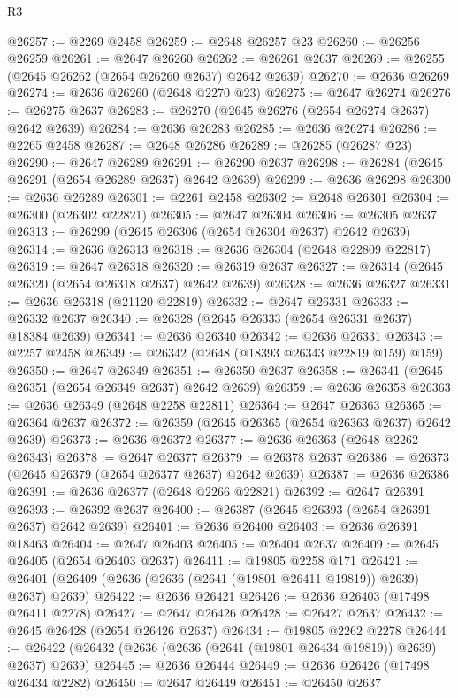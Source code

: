 \begin{lexlean}{R3}
\begin{coremodule}
@26257 := @2269 @2458
@26259 := @2648 @26257 @23
@26260 := @26256 @26259
@26261 := @2647 @26260
@26262 := @26261 @2637
@26269 := @26255 (@2645 @26262 (@2654 @26260 @2637) @2642 @2639)
@26270 := @2636 @26269
@26274 := @2636 @26260 (@2648 @2270 @23)
@26275 := @2647 @26274
@26276 := @26275 @2637
@26283 := @26270 (@2645 @26276 (@2654 @26274 @2637) @2642 @2639)
@26284 := @2636 @26283
@26285 := @2636 @26274
@26286 := @2265 @2458
@26287 := @2648 @26286
@26289 := @26285 (@26287 @23)
@26290 := @2647 @26289
@26291 := @26290 @2637
@26298 := @26284 (@2645 @26291 (@2654 @26289 @2637) @2642 @2639)
@26299 := @2636 @26298
@26300 := @2636 @26289
@26301 := @2261 @2458
@26302 := @2648 @26301
@26304 := @26300 (@26302 @22821)
@26305 := @2647 @26304
@26306 := @26305 @2637
@26313 := @26299 (@2645 @26306 (@2654 @26304 @2637) @2642 @2639)
@26314 := @2636 @26313
@26318 := @2636 @26304 (@2648 @22809 @22817)
@26319 := @2647 @26318
@26320 := @26319 @2637
@26327 := @26314 (@2645 @26320 (@2654 @26318 @2637) @2642 @2639)
@26328 := @2636 @26327
@26331 := @2636 @26318 (@21120 @22819)
@26332 := @2647 @26331
@26333 := @26332 @2637
@26340 := @26328 (@2645 @26333 (@2654 @26331 @2637) @18384 @2639)
@26341 := @2636 @26340
@26342 := @2636 @26331
@26343 := @2257 @2458
@26349 := @26342 (@2648 (@18393 @26343 @22819 @159) @159)
@26350 := @2647 @26349
@26351 := @26350 @2637
@26358 := @26341 (@2645 @26351 (@2654 @26349 @2637) @2642 @2639)
@26359 := @2636 @26358
@26363 := @2636 @26349 (@2648 @2258 @22811)
@26364 := @2647 @26363
@26365 := @26364 @2637
@26372 := @26359 (@2645 @26365 (@2654 @26363 @2637) @2642 @2639)
@26373 := @2636 @26372
@26377 := @2636 @26363 (@2648 @2262 @26343)
@26378 := @2647 @26377
@26379 := @26378 @2637
@26386 := @26373 (@2645 @26379 (@2654 @26377 @2637) @2642 @2639)
@26387 := @2636 @26386
@26391 := @2636 @26377 (@2648 @2266 @22821)
@26392 := @2647 @26391
@26393 := @26392 @2637
@26400 := @26387 (@2645 @26393 (@2654 @26391 @2637) @2642 @2639)
@26401 := @2636 @26400
@26403 := @2636 @26391 @18463
@26404 := @2647 @26403
@26405 := @26404 @2637
@26409 := @2645 @26405 (@2654 @26403 @2637)
@26411 := @19805 @2258 @171
@26421 := @26401 (@26409 (@2636 (@2636 (@2641 (@19801 @26411 @19819)) @2639) @2637) @2639)
@26422 := @2636 @26421
@26426 := @2636 @26403 (@17498 @26411 @2278)
@26427 := @2647 @26426
@26428 := @26427 @2637
@26432 := @2645 @26428 (@2654 @26426 @2637)
@26434 := @19805 @2262 @2278
@26444 := @26422 (@26432 (@2636 (@2636 (@2641 (@19801 @26434 @19819)) @2639) @2637) @2639)
@26445 := @2636 @26444
@26449 := @2636 @26426 (@17498 @26434 @2282)
@26450 := @2647 @26449
@26451 := @26450 @2637

\end{coremodule}
\end{lexlean}
